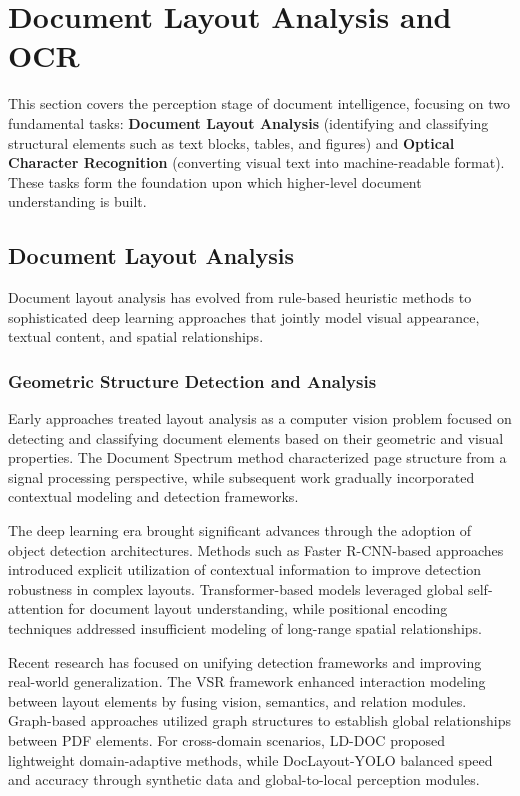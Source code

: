 \section{Document Layout Analysis and OCR}
\label{sec:layout_ocr}

This section covers the perception stage of document intelligence, focusing on two fundamental tasks: \textbf{Document Layout Analysis} (identifying and classifying structural elements such as text blocks, tables, and figures) and \textbf{Optical Character Recognition} (converting visual text into machine-readable format). These tasks form the foundation upon which higher-level document understanding is built.

\subsection{Document Layout Analysis}

Document layout analysis has evolved from rule-based heuristic methods to sophisticated deep learning approaches that jointly model visual appearance, textual content, and spatial relationships.

\subsubsection{Geometric Structure Detection and Analysis}

Early approaches treated layout analysis as a computer vision problem focused on detecting and classifying document elements based on their geometric and visual properties. The Document Spectrum method \cite{ogorman1993documentspectrum} characterized page structure from a signal processing perspective, while subsequent work gradually incorporated contextual modeling and detection frameworks.

The deep learning era brought significant advances through the adoption of object detection architectures. Methods such as Faster R-CNN-based approaches \cite{soto2019visual} introduced explicit utilization of contextual information to improve detection robustness in complex layouts. Transformer-based models \cite{yang2022transformerlayout} leveraged global self-attention for document layout understanding, while positional encoding techniques \cite{zhou2022positionalencodinglayout} addressed insufficient modeling of long-range spatial relationships.

Recent research has focused on unifying detection frameworks and improving real-world generalization. The VSR framework \cite{zhang2021vsr} enhanced interaction modeling between layout elements by fusing vision, semantics, and relation modules. Graph-based approaches \cite{wang2023graphicallayout} utilized graph structures to establish global relationships between PDF elements. For cross-domain scenarios, LD-DOC \cite{gao2024lddoc} proposed lightweight domain-adaptive methods, while DocLayout-YOLO \cite{doclayout_yolo_2024} balanced speed and accuracy through synthetic data and global-to-local perception modules.


